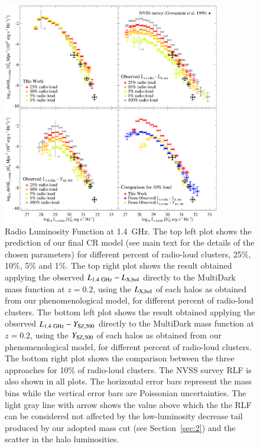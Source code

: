 \documentclass[traditabstract]{aa}
\newcommand{\rmn}{\mathrm}
\begin{document}
\begin{figure}[hbt!]
\centering
\includegraphics[width=0.85\textwidth]{figures/RLFs_1.4.eps}
\caption{Radio Luminosity Function at 1.4~GHz. The top left plot shows the prediction of our final CR model (see main text for the details of the chosen parameters) for different percent of radio-loud clusters, 25\%, 10\%, 5\% and 1\%. The top right plot shows the result obtained applying the observed $L_{1.4~\rmn{GHz}}-L_{\rm{X,bol}}$ directly to the MultiDark mass function at  $z = 0.2$, using the $L_{\rm{X,bol}}$ of each halos as obtained from our phenomenological model, for different percent of radio-loud clusters. The bottom left plot shows the result obtained applying the observed $L_{1.4~\rmn{GHz}}-Y_{\rm{SZ}, 500}$ directly to the MultiDark mass function at  $z = 0.2$,  using the $Y_{\rm{SZ}, 500}$ of each halos as obtained from our phenomenological model, for different percent of radio-loud clusters. The bottom right plot shows the comparison between the three approaches for 10\% of radio-loud clusters. The NVSS survey RLF \citep{1999NewA....4..141G} is also shown in all plots. The horizontal error bars represent the mass bins while the vertical error bars are Poissonian uncertainties. The light gray line with arrow shows the value above which the the RLF can be considered not affected by the low-luminosity decrease tail produced by our adopted mass cut (see Section~\ref{sec:2}) and the scatter in the halo luminosities.}
\label{fig:RLF_1.4}
\end{figure}
\end{document}
